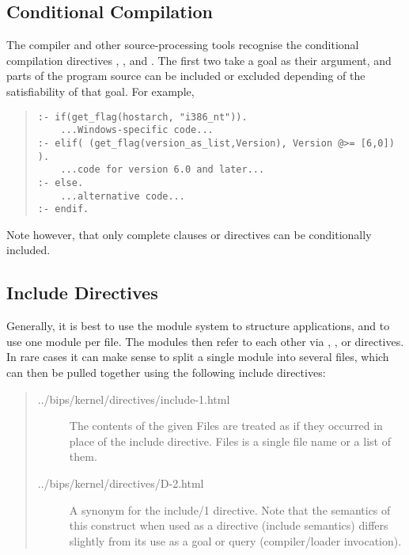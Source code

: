 \subsection{Conditional Compilation}

The compiler and other source-processing tools recognise the conditional
compilation directives
,
,
 and
.
The first two
take a goal as their argument, and parts of the program source can be
included or excluded depending of the satisfiability of that goal.
For example,
\begin{quote}
\begin{verbatim}
:- if(get_flag(hostarch, "i386_nt")).
    ...Windows-specific code...
:- elif( (get_flag(version_as_list,Version), Version @>= [6,0]) ).
    ...code for version 6.0 and later...
:- else.
    ...alternative code...
:- endif.
\end{verbatim}
\end{quote}
Note however, that only complete clauses or directives can be
conditionally included.


\subsection{Include Directives}
\label{secinclude}

Generally, it is best to use the module system to structure {\eclipse}
applications, and to use one module per file.  The modules then refer
to each other via , , or
 directives.
In rare cases it can make sense to split a single module into several
files, which can then be pulled together using the following include
directives:

\begin{quote}
\begin{description}
\item[%
{../bips/kernel/directives/include-1.html}]
The contents of the given Files are treated as if they occurred in place of
the include directive.  Files is a single file name or a list of them.

\item[%
{../bips/kernel/directives/D-2.html}]
A synonym for the include/1 directive.  Note that the semantics of this
construct when used as a directive (include semantics) differs slightly
from its use as a goal or query (compiler/loader invocation).
\end{description}
\end{quote}

